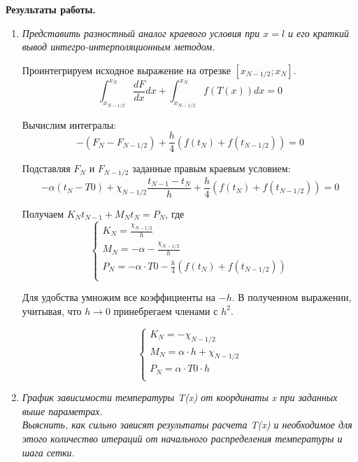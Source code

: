 \textbf{Результаты работы.}
\begin{enumerate}
	\item \textit{Представить разностный аналог краевого условия при $x = l$
	и его краткий вывод интегро-интерполяционным методом.}
	
	Проинтегрируем исходное выражение на отрезке $[x_{N-1/2}; x_{N}]$.
	\begin{equation*}
		\int_{x_{N-1/2}}^{x_{N}} \frac{dF}{dx}dx + \int_{x_{N-1/2}}^{x_{N}} f(T(x))dx = 0
	\end{equation*}
	
	Вычислим интегралы:
	\begin{equation*}
		-(F_{N} - F_{N-1/2}) + \frac{h}{4}(f(t_{N}) + f(t_{N-1/2})) = 0
	\end{equation*}
	
	Подставляя $F_N$ и $F_{N-1/2}$ заданные правым краевым условием:
	\begin{equation*}
		-\alpha(t_N - T0) + \chi_{N-1/2} \dfrac{t_{N-1} - t_{N}}{h}
		+ \frac{h}{4}(f(t_{N}) + f(t_{N-1/2})) = 0
	\end{equation*}
	
	Получаем $K_N t_{N-1} + M_N t_{N} = P_N$, где 
	\begin{equation*}
		\begin{cases}
			K_N = \frac{\chi_{N-1/2}}{h} \\ 
			M_N = -\alpha - \frac{\chi_{N-1/2}}{h}\\
			P_N = -\alpha \cdot T0 - \frac{h}{4}(f(t_{N}) + f(t_{N-1/2}))\\
		\end{cases}
	\end{equation*}

	Для удобства умножим все коэффициенты на $-h$. В полученном выражении, учитывая, что $h \rightarrow 0$ принебрегаем членами с $h^2$.
	
	\begin{equation*}
		\begin{cases}
			K_N = - \chi_{N-1/2} \\ 
			M_N = \alpha \cdot h + \chi_{N-1/2}\\
			P_N = \alpha \cdot T0 \cdot h\\
		\end{cases}
	\end{equation*}
	
	\newpage
	\item \textit{График зависимости температуры T(x) от координаты x при заданных выше параметрах.\\
	Выяснить, как сильно зависят результаты расчета T(x) и необходимое для этого количество итераций от начального распределения температуры и шага сетки.}
	

\end{enumerate}
